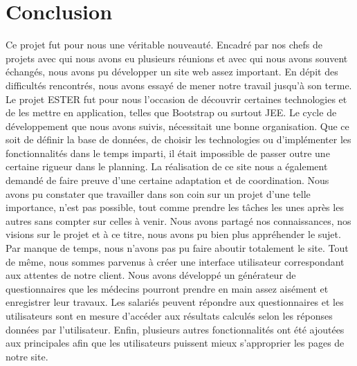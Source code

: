 \chapter*{Conclusion}

Ce projet fut pour nous une véritable nouveauté. Encadré par nos chefs de projets avec qui nous avons eu plusieurs réunions et avec qui nous avons souvent échangés, nous avons pu développer un site web assez important. En dépit des difficultés rencontrés, nous avons essayé de mener notre travail jusqu'à son terme. Le projet ESTER fut pour nous l'occasion de découvrir certaines technologies et de les mettre en application, telles que Bootstrap ou surtout JEE. Le cycle de développement que nous avons suivis, nécessitait une bonne organisation. Que ce soit de définir la base de données, de choisir les technologies ou d'implémenter les fonctionnalités dans le temps imparti, il était impossible de passer outre une certaine rigueur dans le planning. La réalisation de ce site nous a également demandé de faire preuve d'une certaine adaptation et de coordination. 
Nous avons pu constater que travailler dans son coin sur un projet d'une telle importance, n'est pas possible, tout comme prendre les tâches les unes après les autres sans compter sur celles à venir. Nous avons partagé nos connaissances, nos visions sur le projet et à ce titre, nous avons pu bien plus appréhender le sujet. Par manque de temps, nous n'avons pas pu faire aboutir totalement le site. Tout de même, nous sommes parvenus à créer une interface utilisateur correspondant aux attentes de notre client. Nous avons développé un générateur de questionnaires que les médecins pourront prendre en main assez aisément et enregistrer leur travaux. Les salariés peuvent répondre aux questionnaires et les utilisateurs sont en mesure d'accéder aux résultats calculés selon les réponses données par l'utilisateur. Enfin, plusieurs autres fonctionnalités ont été ajoutées aux principales afin que les utilisateurs puissent mieux s'approprier les pages de notre site.
